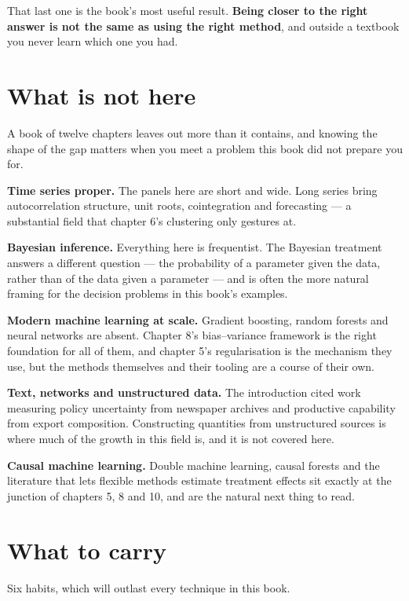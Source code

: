 \documentclass[
  letterpaper,
  10pt,
  twoside,
  openright,
  numbers=noenddot,
  chapterprefix=true]{scrbook}
\begin{document}
That last one is the book's most useful result. \textbf{Being closer to
the right answer is not the same as using the right method}, and outside
a textbook you never learn which one you had.

\section{What is not here}\label{what-is-not-here}

A book of twelve chapters leaves out more than it contains, and knowing
the shape of the gap matters when you meet a problem this book did not
prepare you for.

\textbf{Time series proper.} The panels here are short and wide. Long
series bring autocorrelation structure, unit roots, cointegration and
forecasting --- a substantial field that chapter 6's clustering only
gestures at.

\textbf{Bayesian inference.} Everything here is frequentist. The
Bayesian treatment answers a different question --- the probability of a
parameter given the data, rather than of the data given a parameter ---
and is often the more natural framing for the decision problems in this
book's examples.

\textbf{Modern machine learning at scale.} Gradient boosting, random
forests and neural networks are absent. Chapter 8's bias--variance
framework is the right foundation for all of them, and chapter 5's
regularisation is the mechanism they use, but the methods themselves and
their tooling are a course of their own.

\textbf{Text, networks and unstructured data.} The introduction cited
work measuring policy uncertainty from newspaper archives and productive
capability from export composition. Constructing quantities from
unstructured sources is where much of the growth in this field is, and
it is not covered here.

\textbf{Causal machine learning.} Double machine learning, causal
forests and the literature that lets flexible methods estimate treatment
effects sit exactly at the junction of chapters 5, 8 and 10, and are the
natural next thing to read.

\section{What to carry}\label{what-to-carry}

Six habits, which will outlast every technique in this book.
\end{document}
